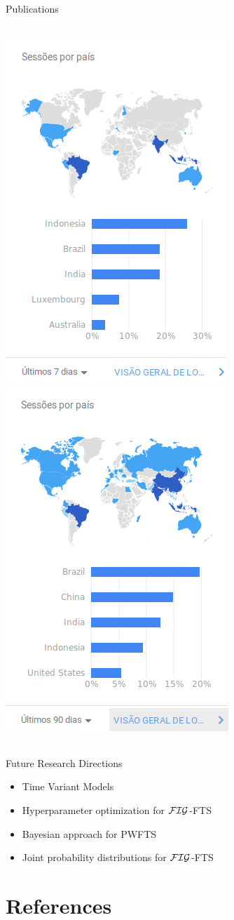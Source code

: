 \documentclass{beamer}
\begin{document}
\begin{frame}{Publications}
\begin{columns}
\centering
\includegraphics[width=.5\textwidth]{figures/pyfts_last07days.png}
\centering
\includegraphics[width=.5\textwidth]{figures/pyfts_last90days.png}
\end{columns}


\end{frame}



\begin{frame}{Future Research Directions}
\linespread{2}
\begin{itemize}
    \item Time Variant Models
    \item Hyperparameter optimization for $\mathcal{FIG}$-FTS
    \item Bayesian approach for PWFTS
    \item Joint probability distributions for  $\mathcal{FIG}$-FTS
\end{itemize}
\end{frame}



\section{References}



\end{document}
